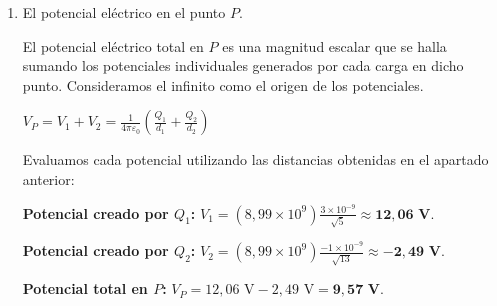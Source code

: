 \documentclass[11pt, a4paper]{article}
\newenvironment{problem}[1][Cuestión]{
	\vspace{0.5cm}
	\noindent{\Large\bfseries #1} \par\vspace{0.5cm}
}{
	\vspace{0.5cm}
}
\begin{document}
\begin{problem}[Cuestión 6]
\begin{enumerate}[label=\alph*)]
{					\textbf{Campo creado por $Q_2 = -1 \text{ nC}$:}
					$\vec{E}_2 = (8,99 \times 10^9) \frac{-1 \times 10^{-9}}{(\sqrt{13})^2} \left( \frac{-3}{\sqrt{13}}\vec{i} + \frac{2}{\sqrt{13}}\vec{j} \right) \approx \mathbf{0,58 \vec{i} - 0,38 \vec{j} \textbf{ N/C}}$.

					\textbf{Campo total en $P$:}
					Sumamos ambas componentes vectoriales para obtener el campo eléctrico resultante:

					$$\vec{E}_T = (2,41 + 0,58)\vec{i} + (4,83 - 0,38)\vec{j} = \mathbf{2,99 \vec{i} + 4,45 \vec{j} \textbf{ N/C}}$$
				}

			\item El potencial eléctrico en el punto $P$.

				{ \color{blue}
					El potencial eléctrico total en $P$ es una magnitud escalar que se halla sumando los potenciales individuales generados por cada carga en dicho punto. Consideramos el infinito como el origen de los potenciales. 

					$V_P = V_1 + V_2 = \frac{1}{4\pi\varepsilon_0} \left( \frac{Q_1}{d_1} + \frac{Q_2}{d_2} \right)$

					Evaluamos cada potencial utilizando las distancias obtenidas en el apartado anterior:

					\textbf{Potencial creado por $Q_1$:}
					$V_1 = (8,99 \times 10^9) \frac{3 \times 10^{-9}}{\sqrt{5}} \approx \mathbf{12,06 \text{ V}}$.

					\textbf{Potencial creado por $Q_2$:}
					$V_2 = (8,99 \times 10^9) \frac{-1 \times 10^{-9}}{\sqrt{13}} \approx \mathbf{-2,49 \text{ V}}$.

					\textbf{Potencial total en $P$:}
					$V_P = 12,06 \text{ V} - 2,49 \text{ V} = \mathbf{9,57 \text{ V}}$.
				}
		\end{enumerate}
	\end{problem}
\end{document}
